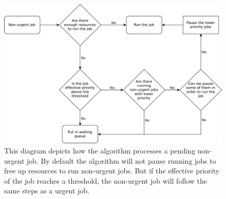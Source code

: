 \begin{figure}
  \centering
  \includegraphics[width=\textwidth]{./customer/diagrams/png/non-urgent-job.png}
  \caption{This diagram depicts how the algorithm processes a pending non-urgent job.
  By default the algorithm will not pause running jobs to free up resources to run non-urgent jobs.
  But if the effective priority of the job reaches a threshold, the non-urgent job will follow the same steps as a urgent job.}
  \label{non-urgent}
\end{figure}

